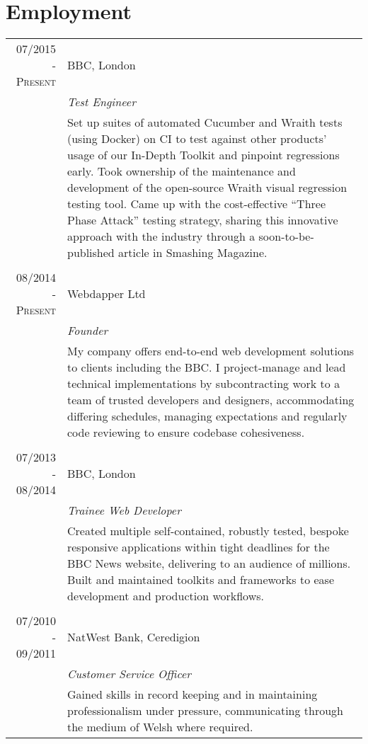 \documentclass[class=article, crop=false]{standalone}
\begin{document}
\section{Employment}
\begin{tabular}{r|p{11cm}}
\textsc{07/2015 - Present} & BBC, London
\\&\emph{Test Engineer}
\\&\footnotesize{
Set up suites of automated Cucumber and Wraith tests (using Docker) on CI to test against other products' usage of our In-Depth Toolkit and pinpoint regressions early. Took ownership of the maintenance and development of the open-source Wraith visual regression testing tool. Came up with the cost-effective ``Three Phase Attack'' testing strategy, sharing this innovative approach with the industry through a soon-to-be-published article in Smashing Magazine.
}
\\\multicolumn{2}{c}{} \\
\textsc{08/2014 - Present} & Webdapper Ltd
\\&\emph{Founder}
\\&\footnotesize{My company offers end-to-end web development solutions to clients including the BBC. I project-manage and lead technical implementations by subcontracting work to a team of trusted developers and designers, accommodating differing schedules, managing expectations and regularly code reviewing to ensure codebase cohesiveness.}
\\\multicolumn{2}{c}{} \\
\textsc{07/2013 - 08/2014} & BBC, London
\\&\emph{Trainee Web Developer}
\\&\footnotesize{Created multiple self-contained, robustly tested, bespoke responsive applications within tight deadlines for the BBC News website, delivering to an audience of millions. Built and maintained toolkits and frameworks to ease development and production workflows.}
\\\multicolumn{2}{c}{} \\
\textsc{07/2010 - 09/2011} & NatWest Bank, Ceredigion
\\&\emph{Customer Service Officer}
\\&\footnotesize{Gained skills in record keeping and in maintaining professionalism under pressure, communicating through the medium of Welsh where required.}
\end{tabular}
\end{document}
